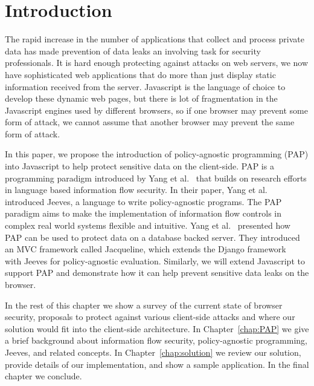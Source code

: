 \chapter{Introduction\label{chap:intro}}

The rapid increase in the number of applications that collect and process private
data has made prevention of data leaks an involving task for security professionals.
It is hard enough protecting against attacks on web servers, we now have sophisticated
web applications that do more than just display static information received from
the server. Javascript is the language of choice to develop these dynamic web pages,
but there is lot of fragmentation in the Javascript engines used by different browsers,
so if one browser may prevent some form of attack, we cannot assume that another
browser may prevent the same form of attack.

In this paper, we propose the introduction of policy-agnostic programming (PAP)
into Javascript to help protect sensitive data on the client-side. PAP is a
programming paradigm introduced by Yang et al.~\cite{Jeeves} that builds on
research efforts in language based information flow security. In their paper,
Yang et al. introduced Jeeves, a language to write policy-agnostic programs. The
PAP paradigm aims to make the implementation of information flow controls in complex
real world systems flexible and intuitive. Yang et al.~\cite{Jacqueline} presented
how PAP can be used to protect data on a database backed server. They introduced
an MVC framework called Jacqueline, which extends the Django framework~\cite{django}
with Jeeves for policy-agnostic evaluation. Similarly, we will extend Javascript
to support PAP and demonstrate how it can help prevent sensitive data leaks on the
browser.

In the rest of this chapter we show a survey of the current state of browser security,
proposals to protect against various client-side attacks and where our solution
would fit into the client-side architecture. In Chapter~\ref{chap:PAP} we give a brief background
about information flow security, policy-agnostic programming, Jeeves, and related
concepts. In Chapter~\ref{chap:solution} we review our solution, provide details
of our implementation, and show a sample application. In the final chapter we conclude.

